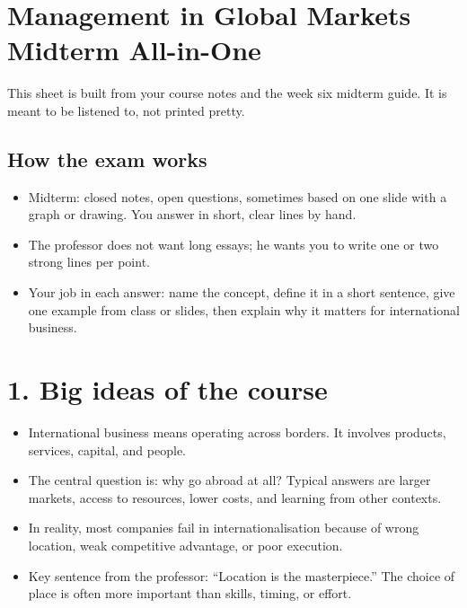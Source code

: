 \documentclass[10pt,a4paper]{article}
\begin{document}
\section*{Management in Global Markets Midterm All-in-One}

This sheet is built from your course notes and the week six midterm guide. It is meant to be listened to, not printed pretty.

\subsection*{How the exam works}
\begin{itemize}
\item Midterm: closed notes, open questions, sometimes based on one slide with a graph or drawing. You answer in short, clear lines by hand.
\item The professor does not want long essays; he wants you to write one or two strong lines per point.
\item Your job in each answer: name the concept, define it in a short sentence, give one example from class or slides, then explain why it matters for international business.
\end{itemize}

\section*{1. Big ideas of the course}
\begin{itemize}
\item International business means operating across borders. It involves products, services, capital, and people.
\item The central question is: why go abroad at all? Typical answers are larger markets, access to resources, lower costs, and learning from other contexts.
\item In reality, most companies fail in internationalisation because of wrong location, weak competitive advantage, or poor execution.
\item Key sentence from the professor: “Location is the masterpiece.” The choice of place is often more important than skills, timing, or effort.
\end{itemize}
\end{document}

